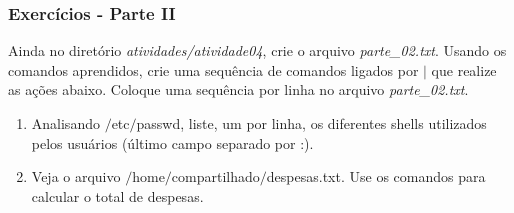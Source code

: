 \documentclass{beamer}
\begin{document}
\begin{frame}
   \frametitle{Exercícios - Parte II}
   Ainda no diretório \textit{atividades/atividade04}, crie o arquivo \textit{parte\_02.txt}. Usando os comandos aprendidos, crie uma sequência de comandos ligados por $|$ 
que realize as ações abaixo. Coloque uma sequência por linha no arquivo \textit{parte\_02.txt}.
   \begin{enumerate}
      \item Analisando $/$etc$/$passwd, liste, um por linha, os diferentes shells utilizados pelos usuários (último campo separado por :). 
      \item Veja o arquivo $/$home$/$compartilhado$/$despesas.txt. Use os comandos para calcular o total de despesas.
   \end{enumerate}
\end{frame}
\end{document}
